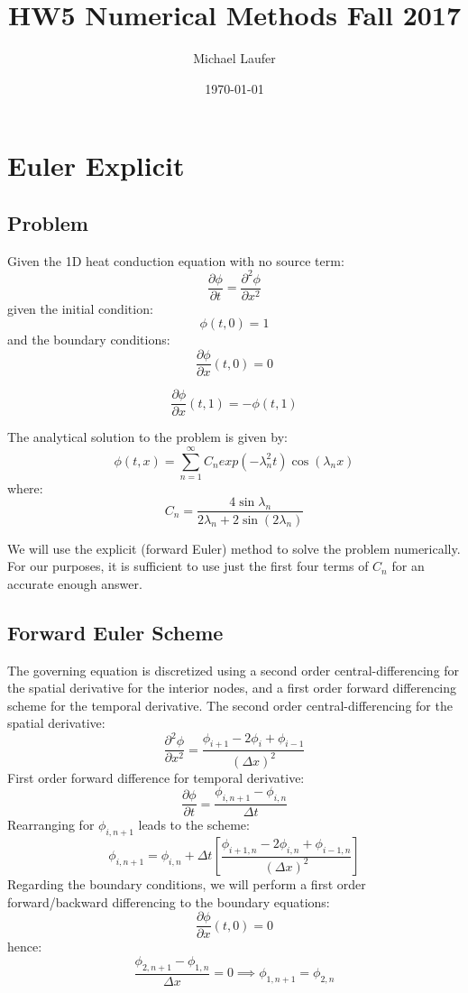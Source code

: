\documentclass[11pt]{article}
\author{Michael Laufer}
\date{\today}
\title{HW5 Numerical Methods Fall 2017}
\begin{document}
\maketitle
\section{Euler Explicit}
\label{sec-1}
\subsection{Problem}
\label{sec-1-1}
Given the 1D heat conduction equation with no source term:
\[
\frac{ \partial \phi }{ \partial t} = \frac{ \partial^{2} \phi }{ \partial x^{2} }  
\]
given the initial condition:
\[
\phi (t,0) = 1
\]
and the boundary conditions:
\[
\frac{ \partial \phi }{ \partial x } ( t,0) = 0
\]

\[
\frac{ \partial \phi }{\partial x} ( t,1) = - \phi (t,1)
\]

The analytical solution to the problem is given by:
\[
\phi (t,x) = \sum_{n=1}^{\infty} C_{n} exp(- \lambda_{n}^{2} t) \cos ( \lambda_{n} x) 
\]
where:
\[
C_{n}= \frac{4 \sin \lambda_{n}}{2 \lambda_{n} + 2 \sin (2 \lambda_{n})}
\]

We will use the explicit (forward Euler) method to solve the problem numerically. For our purposes, it is sufficient to use just the first four terms of $C_{n}$ for an accurate enough answer.

\subsection{Forward Euler Scheme}
\label{sec-1-2}
The governing equation is discretized using a second order central-differencing for the spatial derivative for the interior nodes, and a first order forward differencing scheme for the temporal derivative.
The second order central-differencing for the spatial derivative:
\[
\frac{ \partial^{2} \phi }{ \partial x^{2} } = \frac{\phi_{i+1} -2 \phi_{i} + \phi_{i-1}}{( \Delta x)^{2} }
\]
First order forward difference for temporal derivative:
\[
\frac{ \partial \phi }{ \partial t} = \frac{\phi_{i,n+1} - \phi_{i,n}}{\Delta t}
\]
Rearranging for $\phi_{i,n+1}$ leads to the scheme:
\[
\phi_{i,n+1} = \phi_{i,n} + \Delta t \left[ \frac{\phi_{i+1,n} -2 \phi_{i,n} + \phi_{i-1,n}}{( \Delta x)^{2} } \right]
\]
Regarding the boundary conditions, we will perform a first order forward/backward differencing to the boundary equations:
\[
\frac{ \partial \phi }{ \partial x } ( t,0) = 0
\]
hence:
\[
\frac{\phi_{2,n+1} - \phi_{1,n}}{\Delta x} = 0 \implies \phi_{1,n+1}=\phi_{2,n}
\]
\end{document}
